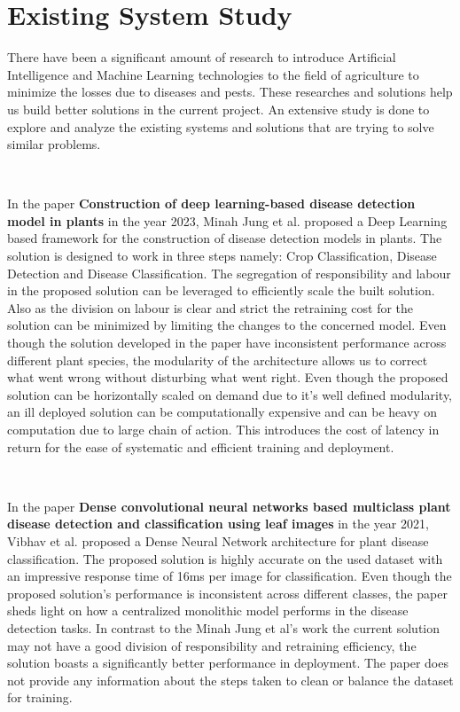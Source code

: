 \label{chap.2}


\section{Existing System Study}

There have been a significant amount of research to introduce Artificial Intelligence and Machine Learning technologies to the field of agriculture to minimize the losses due to diseases and pests. These researches and solutions help us build better solutions in the current project. An extensive study is done to explore and analyze the existing systems and solutions that are trying to solve similar problems.

\

In the paper \textbf{Construction of deep learning-based disease detection model in plants} in the year 2023, Minah Jung et al. proposed a Deep Learning based framework for the construction of disease detection models in plants. The solution is designed to work in three steps namely: Crop Classification, Disease Detection and Disease Classification\cite{jung2023construction}. The segregation of responsibility and labour in the proposed solution can be leveraged to efficiently scale the built solution. Also as the division on labour is clear and strict the retraining cost for the solution can be minimized by limiting the changes to the concerned model. Even though the solution developed in the paper have inconsistent performance across different plant species, the modularity of the architecture allows us to correct what went wrong without disturbing what went right. Even though the proposed solution can be horizontally scaled on demand due to it's well defined modularity, an ill deployed solution can be computationally expensive and can be heavy on computation due to large chain of action. This introduces the cost of latency in return for the ease of systematic and efficient training and deployment. 

\

In the paper \textbf{Dense convolutional neural networks based multiclass plant disease detection and classification using leaf images } in the year 2021, Vibhav et al. proposed a Dense Neural Network architecture for plant disease classification. The proposed solution is highly accurate on the used dataset with an impressive response time of 16ms per image for classification. Even though the proposed solution's performance is inconsistent across different classes, the paper sheds light on how a centralized monolithic model performs in the disease detection tasks. In contrast to the Minah Jung et al's work the current solution may not have a good division of responsibility and retraining efficiency, the solution boasts a significantly better performance in deployment. The paper does not provide any information about the steps taken to clean or balance the dataset for training.

